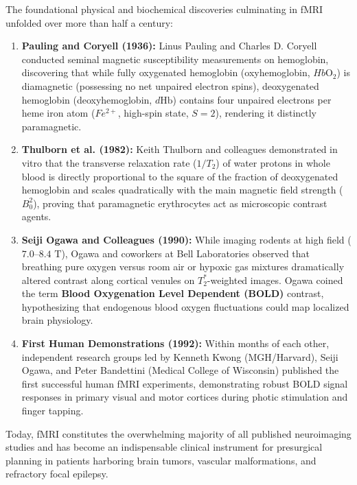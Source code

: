 \documentclass[11pt,a4paper]{article}
\begin{document}
The foundational physical and biochemical discoveries culminating in fMRI unfolded over more than half a century:
\begin{enumerate}[leftmargin=2em]
    \item \textbf{Pauling and Coryell (1936):} Linus Pauling and Charles D. Coryell conducted seminal magnetic susceptibility measurements on hemoglobin, discovering that while fully oxygenated hemoglobin (oxyhemoglobin, $Hb\text{O}_2$) is diamagnetic (possessing no net unpaired electron spins), deoxygenated hemoglobin (deoxyhemoglobin, $d\text{Hb}$) contains four unpaired electrons per heme iron atom ($Fe^{2+}$, high-spin state, $S = 2$), rendering it distinctly paramagnetic.
    \item \textbf{Thulborn et al. (1982):} Keith Thulborn and colleagues demonstrated in vitro that the transverse relaxation rate ($1/T_2$) of water protons in whole blood is directly proportional to the square of the fraction of deoxygenated hemoglobin and scales quadratically with the main magnetic field strength ($B_0^2$), proving that paramagnetic erythrocytes act as microscopic contrast agents.
    \item \textbf{Seiji Ogawa and Colleagues (1990):} While imaging rodents at high field ($7.0\text{--}8.4\text{ T}$), Ogawa and coworkers at Bell Laboratories observed that breathing pure oxygen versus room air or hypoxic gas mixtures dramatically altered contrast along cortical venules on $T_2^*$-weighted images. Ogawa coined the term \textbf{Blood Oxygenation Level Dependent (BOLD)} contrast, hypothesizing that endogenous blood oxygen fluctuations could map localized brain physiology.
    \item \textbf{First Human Demonstrations (1992):} Within months of each other, independent research groups led by Kenneth Kwong (MGH/Harvard), Seiji Ogawa, and Peter Bandettini (Medical College of Wisconsin) published the first successful human fMRI experiments, demonstrating robust BOLD signal responses in primary visual and motor cortices during photic stimulation and finger tapping.
\end{enumerate}

Today, fMRI constitutes the overwhelming majority of all published neuroimaging studies and has become an indispensable clinical instrument for presurgical planning in patients harboring brain tumors, vascular malformations, and refractory focal epilepsy.
\end{document}
